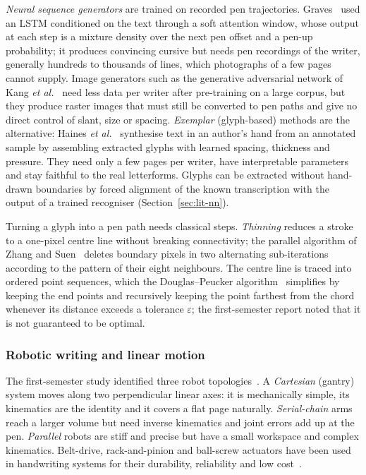 \emph{Neural sequence generators} are trained on recorded pen trajectories. Graves~\cite{graves2013} used an LSTM conditioned on the text through a soft attention window, whose output at each step is a mixture density over the next pen offset and a pen-up probability; it produces convincing cursive but needs pen recordings of the writer, generally hundreds to thousands of lines, which photographs of a few pages cannot supply. Image generators such as the generative adversarial network of Kang \emph{et al.}~\cite{kang2020} need less data per writer after pre-training on a large corpus, but they produce raster images that must still be converted to pen paths and give no direct control of slant, size or spacing. \emph{Exemplar} (glyph-based) methods are the alternative: Haines \emph{et al.}~\cite{haines2016} synthesise text in an author's hand from an annotated sample by assembling extracted glyphs with learned spacing, thickness and pressure. They need only a few pages per writer, have interpretable parameters and stay faithful to the real letterforms. Glyphs can be extracted without hand-drawn boundaries by forced alignment of the known transcription with the output of a trained recogniser (Section~\ref{sec:lit-nn}).

Turning a glyph into a pen path needs classical steps. \emph{Thinning} reduces a stroke to a one-pixel centre line without breaking connectivity; the parallel algorithm of Zhang and Suen~\cite{zhang1984} deletes boundary pixels in two alternating sub-iterations according to the pattern of their eight neighbours. The centre line is traced into ordered point sequences, which the Douglas--Peucker algorithm~\cite{douglas1973} simplifies by keeping the end points and recursively keeping the point farthest from the chord whenever its distance exceeds a tolerance $\varepsilon$; the first-semester report noted that it is not guaranteed to be optimal.

\subsubsection{Robotic writing and linear motion}
\label{sec:lit-robot}

The first-semester study identified three robot topologies~\cite{teikari2016}. A \emph{Cartesian} (gantry) system moves along two perpendicular linear axes: it is mechanically simple, its kinematics are the identity and it covers a flat page naturally. \emph{Serial-chain} arms reach a larger volume but need inverse kinematics and joint errors add up at the pen. \emph{Parallel} robots are stiff and precise but have a small workspace and complex kinematics. Belt-drive, rack-and-pinion and ball-screw actuators have been used in handwriting systems for their durability, reliability and low cost~\cite{iqs2024}.

